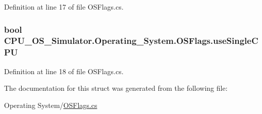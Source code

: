 Definition at line 17 of file O\+S\+Flags.\+cs.

\hypertarget{struct_c_p_u___o_s___simulator_1_1_operating___system_1_1_o_s_flags_a49e0bc2c9ec783c9fb0678ace83352cf}{}
\subsubsection[{use\+Single\+C\+P\+U}]{\setlength{\rightskip}{0pt plus 5cm}bool C\+P\+U\+\_\+\+O\+S\+\_\+\+Simulator.\+Operating\+\_\+\+System.\+O\+S\+Flags.\+use\+Single\+C\+P\+U}\label{struct_c_p_u___o_s___simulator_1_1_operating___system_1_1_o_s_flags_a49e0bc2c9ec783c9fb0678ace83352cf}


Definition at line 18 of file O\+S\+Flags.\+cs.



The documentation for this struct was generated from the following file\+:\begin{DoxyCompactItemize}
\item 
Operating System/\hyperlink{_o_s_flags_8cs}{O\+S\+Flags.\+cs}\end{DoxyCompactItemize}
